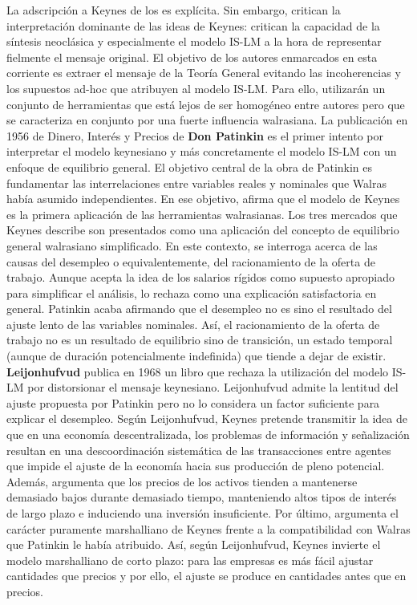 \documentclass{nuevotema}
\begin{document}
La adscripción a Keynes de los  es explícita. Sin embargo, critican la interpretación dominante de las ideas de Keynes: critican la capacidad de la síntesis neoclásica y especialmente el modelo IS-LM a la hora de representar fielmente el mensaje original. El objetivo de los autores enmarcados en esta corriente es extraer el mensaje de la Teoría General evitando las incoherencias y los supuestos ad-hoc que atribuyen al modelo IS-LM. Para ello, utilizarán un conjunto de herramientas que está lejos de ser homogéneo entre autores pero que se caracteriza en conjunto por una fuerte influencia walrasiana. La publicación en 1956 de Dinero, Interés y Precios de \textbf{Don Patinkin} es el primer intento por interpretar el modelo keynesiano y más concretamente el modelo IS-LM con un enfoque de equilibrio general. El objetivo central de la obra de Patinkin es fundamentar las interrelaciones entre variables reales y nominales que Walras había asumido independientes. En ese objetivo, afirma que el modelo de Keynes es la primera aplicación de las herramientas walrasianas. Los tres mercados que Keynes describe son presentados como una aplicación del concepto de equilibrio general walrasiano simplificado. En este contexto, se interroga acerca de las causas del desempleo o equivalentemente, del racionamiento de la oferta de trabajo. Aunque acepta la idea de los salarios rígidos como supuesto apropiado para simplificar el análisis, lo rechaza como una explicación satisfactoria en general. Patinkin acaba afirmando que el desempleo no es sino el resultado del ajuste lento de las variables nominales. Así, el racionamiento de la oferta de trabajo no es un resultado de equilibrio sino de transición, un estado temporal (aunque de duración potencialmente indefinida) que tiende a dejar de existir. \textbf{Leijonhufvud} publica en 1968 un libro que rechaza la utilización del modelo IS-LM por distorsionar el mensaje keynesiano. Leijonhufvud admite la lentitud del ajuste propuesta por Patinkin pero no lo considera un factor suficiente para explicar el desempleo. Según Leijonhufvud, Keynes pretende transmitir la idea de que en una economía descentralizada, los problemas de información y señalización resultan en una descoordinación sistemática de las transacciones entre agentes que impide el ajuste de la economía hacia sus producción de pleno potencial. Además, argumenta que los precios de los activos tienden a mantenerse demasiado bajos durante demasiado tiempo, manteniendo altos tipos de interés de largo plazo e induciendo una inversión insuficiente. Por último, argumenta el carácter puramente marshalliano de Keynes frente a la compatibilidad con Walras que Patinkin le había atribuido. Así, según Leijonhufvud, Keynes invierte el modelo marshalliano de corto plazo: para las empresas es más fácil ajustar cantidades que precios y por ello, el ajuste se produce en cantidades antes que en precios.
\end{document}
